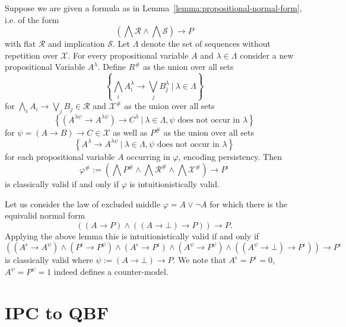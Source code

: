 \documentclass[runningheads]{llncs}
\begin{document}
\begin{theorem}\label{thm:prop-translation}
	Suppose we are given a formula as in Lemma~\ref{lemma:propositional-normal-form}, i.e. of the form
	$$\left(\bigwedge\mathcal R\wedge\bigwedge\mathcal S\right)\to P$$
	with flat $\mathcal R$ and implication $\mathcal S$. Let $\Lambda$ denote the set of sequences without repetition over $\mathcal X$. For every propositional variable $A$ and $\lambda\in\Lambda$ consider a new propositional Variable $A^\lambda$. Define $R^\#$ as the union over all sets
	$$
		\left\{\bigwedge_iA_i^\lambda\to\bigvee_jB_j^\lambda\:|\:\lambda\in\Lambda\right\}
	$$
	for $\bigwedge_iA_i\to\bigvee_jB_j\in\mathcal R$ and $\mathcal X^\#$ as the union over all sets
	$$
		\left\{\left(A^{\lambda\psi} \to A^{\lambda\psi}\right)\to C^\lambda\:|\:\lambda\in\Lambda, \psi\text{ does not occur in }\lambda\right\}
	$$
	for $\psi = (A\to B)\to C\in\mathcal X$ as well as $P^\#$ as the union over all sets
	$$
		\left\{A^\lambda\to A^{\lambda\psi}\:|\:\lambda\in\Lambda, \psi\text{ does not occur in }\lambda\right\}
	$$
	 for each propositional variable $A$ occurring in $\varphi$, encoding persistency. Then
	$$
		\varphi^\# := \left(\bigwedge P^\#\wedge\bigwedge \mathcal R^\#\wedge\bigwedge\mathcal X^\#\right)\to P^\epsilon
	$$
	is classically valid if and only if $\varphi$ is intuitionistically valid.
\end{theorem}

\begin{example}
	Let us consider the law of excluded middle $\varphi = A\vee\neg A$ for which there is the equivalid normal form
	$$((A\to P)\wedge ((A\to \bot)\to P))\to P.$$
	Applying the above lemma this is intuitionistically valid if and only if $$((A^\epsilon\to A^\psi)\wedge(P^\epsilon\to P^\psi)\wedge(A^\epsilon\to P^\epsilon)\wedge(A^\psi\to P^\psi)\wedge ((A^\psi\to \bot)\to P^\epsilon))\to P^\epsilon$$ is classically valid where $\psi := (A\to \bot)\to P$.
	We note that $A^\epsilon  = P^\epsilon = 0$, $A^\psi = P^{\psi}  = 1$ indeed defines a counter-model.
\end{example}	

\section{IPC to QBF}\label{sec:qbf}
\end{document}

